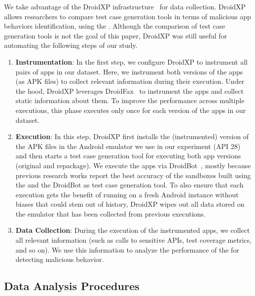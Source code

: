 We take advantage of the DroidXP infrastructure~\cite{DBLP:conf/scam/CostaMCMVBC20}
for data collection. DroidXP allows researchers to compare 
test case generation tools in terms of malicious app behaviors identification, using the \mas. Although the comparison of test
case generation tools is not the goal of this paper, DroidXP
was still useful for automating the following steps of our study.


\begin{enumerate}[S1]
 \item \textbf{Instrumentation}: In the first step,
we configure DroidXP to instrument all pairs of apps in our dataset.
Here, we instrument both versions of the apps (as APK files) to collect relevant information during their execution. Under the hood, DroidXP leverages
DroidFax~\cite{DBLP:conf/icsm/CaiR17a} to instrument the apps and collect static
information about them. To improve the performance across multiple executions,
this phase executes only once for each version of the apps in our dataset.

\item \textbf{Execution}: In this step, DroidXP first installs the (instrumented) version of the APK files in the Android emulator we use in our experiment (API 28) and then starts a test case generation tool for executing both app versions (original and repackage). We execute the apps via DroidBot~\cite{DBLP:conf/icse/LiYGC17}, mostly because previous research works report the best accuracy of the sandboxes built using the \mas and the DroidBot as test case generation tool. To also ensure that each execution gets the benefit of running on a fresh Android instance without biases that could stem out of history, DroidXP wipes out all data stored on the emulator that has been collected from previous executions.


\item \textbf{Data Collection}: During the execution of the instrumented apps, we collect all relevant information (such as calls to sensitive APIs, test coverage metrics, and so on). We use this information to analyze the performance of the \mas for detecting malicious behavior.
\end{enumerate}

\subsection{Data Analysis Procedures} \label{sec:dataAnalysisProc}



